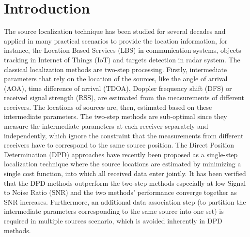 \documentclass[review]{elsarticle}
\begin{document}
\section{Introduction}
The source localization technique has been studied for several decades and applied in many practical scenarios to provide the location information, for instance, the Location-Based Services (LBS) in communication systems, objects tracking in Internet of Things (IoT) and targets detection in radar system. 
The classical localization methods are two-step processing. Firstly, intermediate parameters that rely on the location of the sources, like the angle of arrival (AOA), time difference of arrival (TDOA), Doppler frequency shift (DFS) or received signal strength (RSS), are estimated from the measurements of different receivers. The locations of sources are, then, estimated based on these intermediate parameters. The two-step methods are sub-optimal since they measure the intermediate parameters at each receiver separately and independently, which ignore the constraint that the measurements from different receivers have to correspond to the same source position. 
The Direct Position Determination (DPD) approaches have recently been proposed as a single-step localization technique where the source locations are estimated by minimizing a single cost function, into which all received data enter jointly. It has been verified that the DPD methods outperform the two-step methods especially at low Signal to Noise Ratio (SNR) and the two methods' performance converge together as SNR increases. Furthermore, an additional data association step (to partition the intermediate parameters corresponding to the same source into one set) is required in multiple sources scenario, which is avoided inherently in DPD methods. 
\end{document}
